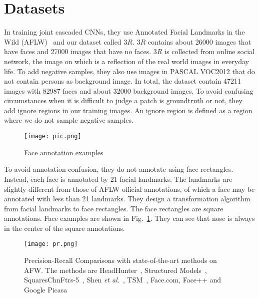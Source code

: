 \documentclass[10pt,twocolumn,letterpaper]{article}
\begin{document}
\section{Datasets}
In training joint cascaded CNNs, they use Annotated Facial Landmarks in the Wild (AFLW)~\cite{name3} and our dataset called 3$R$. 3$R$ contains about 26000 images that have faces and 27000 images that have no faces. 3$R$ is collected from online social network, the image on which is a reflection of the real world images in everyday life. To add negative samples, they also use images in PASCAL VOC2012 that do not contain persons as background image. In total, the dataset contain 47211 images with 82987 faces and about 32000 background images. To avoid confusing circumstances when it is difficult to judge a patch is groundtruth or not, they add ignore regions in our training images. An ignore region is defined as a region where we do not sample negative samples.
\begin{figure}[!htb]
 \centering
 \texttt{[image: pic.png]}\\
 \caption{Face annotation examples}\label{Figure1}
 \end{figure}
\par To avoid annotation confusion, they do not annotate using face rectangles. Instead, each face is annotated by 21 facial landmarks. The landmarks are slightly different from those of AFLW official annotations, of which a face may be annotated with less than 21 landmarks. They design a transformation algorithm from facial landmarks to face rectangles. The face rectangles are square annotations. Face examples are shown in Fig.~\ref{Figure1}. They can see that nose is always in the center of the square annotations.
\begin{figure}[!htb]
 \centering
 \texttt{[image: pr.png]}\\
 \caption{Precision-Recall Comparisons with state-of-the-art methods on AFW. The methods are HeadHunter~\cite{name18}, Structured Models~\cite{name30}, SquaresChnFtrs-5~\cite{name18}, Shen \emph{et al.}~\cite{name25}, TSM~\cite{name39}, Face.com, Face++ and Google Picasa}\label{Figure3}
 \end{figure}
\end{document}
